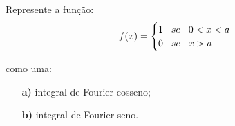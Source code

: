 \linespread{1.5}
Represente a função:
\begin{equation*}
    f(x) = \begin{cases}
    1 \hspace{0.3cm} se \hspace{0.3cm} 0 < x < a\\
    0 \hspace{0.3cm} se \hspace{0.3cm} x > a
    \end{cases}
\end{equation*}

como uma:
\begin{itemize}
    \item[\textbf{a)}] integral de Fourier cosseno;
    \item[\textbf{b)}] integral de Fourier seno.
\end{itemize}
